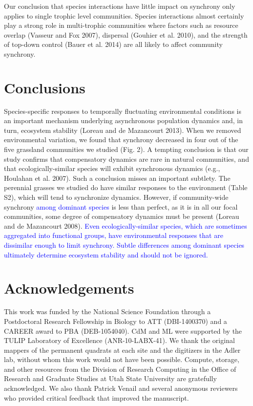 \documentclass[12pt,]{article}
\begin{document}
Our conclusion that species interactions have little impact on synchrony
only applies to single trophic level communities. Species interactions
almost certainly play a strong role in multi-trophic communities where
factors such as resource overlap (Vasseur and Fox 2007), dispersal
(Gouhier et al. 2010), and the strength of top-down control (Bauer et
al. 2014) are all likely to affect community synchrony.

\section{Conclusions}

Species-specific responses to temporally fluctuating environmental
conditions is an important mechanism underlying asynchronous population
dynamics and, in turn, ecosystem stability (Loreau and {{de Mazancourt}}
2013). When we removed environmental variation, we found that synchrony
decreased in four out of the five grassland communities we studied (Fig.
2). A tempting conclusion is that our study confirms that compensatory
dynamics are rare in natural communities, and that ecologically-similar
species will exhibit synchronous dynamics (e.g., Houlahan et al. 2007).
Such a conclusion misses an important subtlety. The perennial grasses we
studied do have similar responses to the environment (Table S2), which
will tend to synchronize dynamics. However, if community-wide synchrony
\textcolor{blue}{among dominant species} is less than perfect, as it is
in all our focal communities, some degree of compensatory dynamics must
be present (Loreau and {{de Mazancourt}} 2008).
\textcolor{blue}{Even ecologically-similar species, which are sometimes aggregated into functional groups, have environmental responses that are dissimilar enough to limit synchrony.
Subtle differences among dominant species ultimately determine ecosystem stability and should not be ignored.}

\section{Acknowledgements}

This work was funded by the National Science Foundation through a
Postdoctoral Research Fellowship in Biology to ATT (DBI-1400370) and a
CAREER award to PBA (DEB-1054040). CdM and ML were supported by the
TULIP Laboratory of Excellence (ANR-10-LABX-41). We thank the original
mappers of the permanent quadrats at each site and the digitizers in the
Adler lab, without whom this work would not have been possible. Compute,
storage, and other resources from the Division of Research Computing in
the Office of Research and Graduate Studies at Utah State University are
gratefully acknowledged. We also thank Patrick Venail and several
anonymous reviewers who provided critical feedback that improved the
manuscript.
\end{document}
